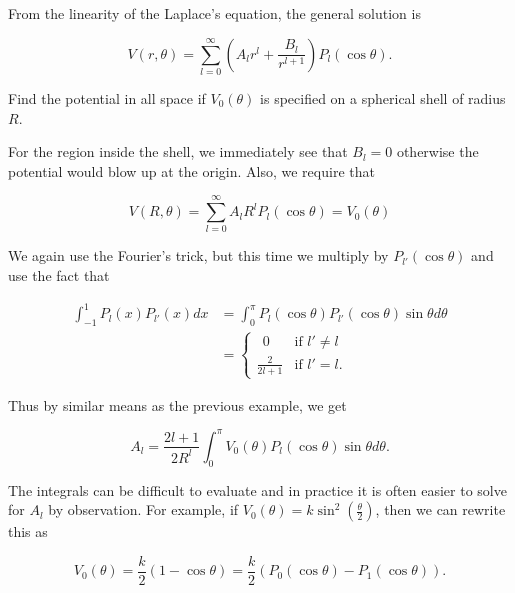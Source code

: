 \documentclass[english,a4paper,12pt]{report}
\begin{document}
From the linearity of the Laplace's equation, the general solution is

\begin{equation}
    V(r,\theta ) = \sum_{l=0}^{\infty} (A_{l} r^{l} + \frac{B_{l} }{r^{l+1} } )P_{l} (\cos \theta). \label{sphlap1} 
\end{equation}

{Find the potential in all space if \(V_0(\theta )\) is specified on a spherical shell of radius \(R\).}
{For the region inside the shell, we immediately see that \(B_{l} = 0\) otherwise the potential would blow up at the origin. Also, we require that 

\begin{equation}
    V(R,\theta ) = \sum_{l=0}^{\infty} A_{l} R^{l} P_{l} (\cos \theta ) = V_{0} (\theta )
\end{equation}

We again use the Fourier's trick, but this time we multiply by \(P_{l'} (\cos \theta )\) and use the fact that 

\begin{equation}
    \begin{aligned}
        \int_{-1}^{1} P_{l} (x) P_{l'} (x) dx &= \int_{0}^{\pi } P_{l} (\cos \theta ) P_{l'} (\cos \theta ) \sin \theta d\theta \\ &= \begin{cases}
            ~~0 & \text{if } l' \neq l \\[10pt]
            \displaystyle \frac{2}{2l+1} & \text{if } l' = l.
            \end{cases}
    \end{aligned}
\end{equation}

Thus by similar means as the previous example, we get

\begin{equation}
    A_{l} = \frac{2l+1}{2R^{l} } \int_{0}^{\pi } V_{0} (\theta ) P_{l} (\cos \theta ) \sin \theta d\theta.
\end{equation}

The integrals can be difficult to evaluate and in practice it is often easier to solve for \(A_{l} \) by observation. For example, if \(\displaystyle V_0(\theta ) = k\sin ^2\left(\frac{\theta }{2} \right)\), then we can rewrite this as

\begin{equation}
    V_0(\theta ) = \frac{k}{2} (1-\cos \theta ) = \frac{k}{2} (P_0(\cos \theta ) - P_1(\cos \theta )).
\end{equation}

}
\end{document}

